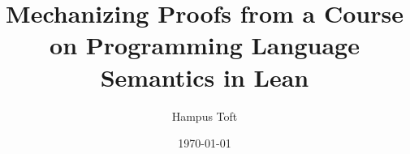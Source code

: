 \title{Mechanizing Proofs from a Course on Programming Language Semantics in Lean}
\author{Hampus Toft}
\date{\today}

\maketitle
